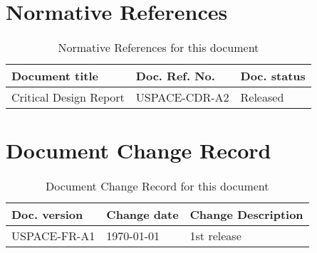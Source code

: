 \thispagestyle{plain}
\chapter*{Normative References}
%
\begin{table}[H]
\centering
\caption{Normative References for this document}
\label{tab:normative_references}
\begin{tabular}{lll}
\hline
\textbf{Document title} & \textbf{Doc. Ref. No.} & \textbf{Doc. status}\\
\hline
Critical Design Report & USPACE-CDR-A2 & Released\\
\hline
\end{tabular}
\end{table}
%
\newpage
%
\thispagestyle{plain}
\chapter*{Document Change Record}
%
%
\begin{table}[H]
\centering
\caption{Document Change Record for this document}
\label{tab:document_change_record}
\begin{tabular}{p{}p{}p{}}
\hline
\textbf{Doc. version} & \textbf{Change date} & \textbf{Change Description}\\
\hline
USPACE-FR-A1 & \today & 1st release\\
\hline
\end{tabular}
\end{table}